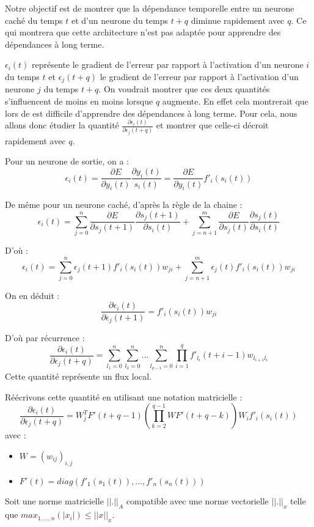 Notre objectif est de montrer que la dépendance temporelle entre un neurone caché du temps $t$ et d'un neurone du temps $t + q$ diminue rapidement avec $q$. Ce qui montrera que cette architecture n'est pas adaptée pour apprendre des dépendances à long terme.

$\epsilon_i(t)$ représente le gradient de l'erreur par rapport à l'activation d'un neurone $i$ du temps $t$ et $\epsilon_j(t+q)$ le gradient de l'erreur par rapport à l'activation d'un neurone $j$ du temps $t+q$. On voudrait montrer que ces deux quantités s'influencent de moins en moins lorsque $q$ augmente. En effet cela montrerait que lors de est difficile d'apprendre des dépendances à long terme. Pour cela, nous allons donc étudier la quantité $\frac{\partial \epsilon_i(t)}{\partial \epsilon_j(t+q)}$ et montrer que celle-ci décroit rapidement avec $q$.

Pour un neurone de sortie, on a :
$$
\epsilon_i(t) = \frac{\partial E}{\partial y_i(t)}\frac{\partial y_i(t)}{s_i(t)} = \frac{\partial E}{\partial y_i(t)}f'_i(s_i(t))
$$

De même pour un neurone caché, d'après la règle de la chaine :
$$
\epsilon_i(t) = \sum_{j = 0}^{n}{\frac{\partial E}{\partial s_j(t+1)}\frac{\partial s_j(t+1)}{\partial s_i(t)}} + \sum_{j = n+1}^{m}{\frac{\partial E}{\partial s_j(t)}\frac{\partial s_j(t)}{\partial s_i(t)}}
$$

D'où :
$$
\epsilon_i(t) = \sum_{j = 0}^{n}{\epsilon_j(t+1)f'_i(s_i(t))w_{ji}} + \sum_{j = n+1}^{m}{\epsilon_j(t)f'_i(s_i(t))w_{ji}}
$$

On en déduit :
$$
\frac{\partial \epsilon_i(t)}{\partial \epsilon_j(t+1)} = f'_i(s_i(t))w_{ji}
$$

D'où par récurrence :
$$
\frac{\partial \epsilon_i(t)}{\partial \epsilon_j(t+q)} = \sum_{l_1 = 0}^{n}{\sum_{l_2 = 0}^{n}{...\sum_{l_{q-1} = 0}^{n}{\prod_{i=1}^{q}{f'_{l_i}(t+i-1)w_{l_{i+1}l_i}}}}}
$$
Cette quantité représente un flux local.

Réécrivons cette quantité en utilisant une notation matricielle :
$$
\frac{\partial \epsilon_i(t)}{\partial \epsilon_j(t+q)} = W_j^TF'(t + q - 1)(\prod_{k = 2}^{q-1}{WF'(t + q - k)})W_if'_i(s_i(t))
$$
avec : 
\begin{itemize}
\item $W = (w_{ij})_{i,j}$
\item $F'(t) = diag(f'_1(s_1(t)), ..., f'_n(s_n(t)))$
\end{itemize}

Soit une norme matricielle $||.||_A$ compatible avec une norme vectorielle $||.||_x$ telle que $max_{1, ..., n}(|x_i|) \leq ||x||_x$.

